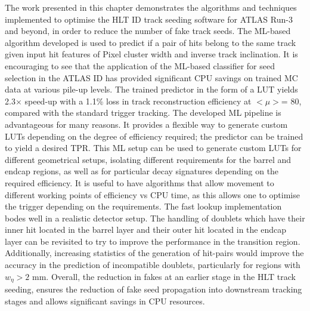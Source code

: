The work presented in this chapter demonstrates the algorithms and techniques implemented to optimise the HLT ID track seeding software for ATLAS Run-3 and beyond, in order to reduce the number of fake track seeds. The ML-based algorithm developed is used to predict if a pair of hits belong to the same track given input hit features of Pixel cluster width and inverse track inclination. It is encouraging to see that the application of the ML-based classifier for seed selection in the ATLAS ID has provided significant CPU savings on trained MC data at various pile-up levels. The trained predictor in the form of a LUT yields 2.3$\times$ speed-up with a 1.1\% loss in track reconstruction efficiency at $< \mu >$= 80, compared with the standard trigger tracking. The developed ML pipeline is advantageous for many reasons. It provides a flexible way to generate custom LUTs depending on the degree of efficiency required; the predictor can be trained to yield a desired TPR. This ML setup can be used to generate custom LUTs for different geometrical setups, isolating different requirements for the barrel and endcap regions, as well as for particular decay signatures depending on the required efficiency. It is useful to have algorithms that allow movement to different working points of efficiency vs CPU time, as this allows one to optimise the trigger depending on the requirements. The fast lookup implementation bodes well in a realistic detector setup. The handling of doublets which have their inner hit located in the barrel layer and their outer hit located in the endcap layer can be revisited to try to improve the performance in the transition region. Additionally, increasing statistics of the generation of hit-pairs would improve the accuracy in the prediction of incompatible doublets, particularly for regions with $w_{\eta} > 2$ mm. Overall, the reduction in fakes at an earlier stage in the HLT track seeding, ensures the reduction of fake seed propagation into downstream tracking stages and allows significant savings in CPU resources.


